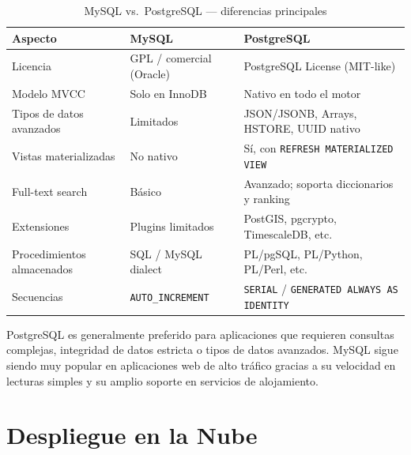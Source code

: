 \begin{table}[H]
  \centering
  \caption{MySQL vs.\ PostgreSQL — diferencias principales}
  \renewcommand{\arraystretch}{1.3}
  \begin{tabularx}{\textwidth}{l X X}
    \toprule
    \textbf{Aspecto}          & \textbf{MySQL}                          & \textbf{PostgreSQL}                        \\
    \midrule
    Licencia                  & GPL / comercial (Oracle)                & PostgreSQL License (MIT-like)              \\
    Modelo MVCC               & Solo en InnoDB                          & Nativo en todo el motor                    \\
    Tipos de datos avanzados  & Limitados                               & JSON/JSONB, Arrays, HSTORE, UUID nativo    \\
    Vistas materializadas     & No nativo                               & Sí, con \texttt{REFRESH MATERIALIZED VIEW} \\
    Full-text search          & Básico                                  & Avanzado; soporta diccionarios y ranking   \\
    Extensiones               & Plugins limitados                       & PostGIS, pgcrypto, TimescaleDB, etc.       \\
    Procedimientos almacenados& SQL / MySQL dialect                     & PL/pgSQL, PL/Python, PL/Perl, etc.        \\
    Secuencias                & \texttt{AUTO\_INCREMENT}                & \texttt{SERIAL} / \texttt{GENERATED ALWAYS AS IDENTITY} \\
    \bottomrule
  \end{tabularx}
\end{table}

\begin{nota}
  PostgreSQL es generalmente preferido para aplicaciones que requieren
  consultas complejas, integridad de datos estricta o tipos de datos
  avanzados. MySQL sigue siendo muy popular en aplicaciones web de alto
  tráfico gracias a su velocidad en lecturas simples y su amplio soporte
  en servicios de alojamiento.
\end{nota}

\section{Despliegue en la Nube}

